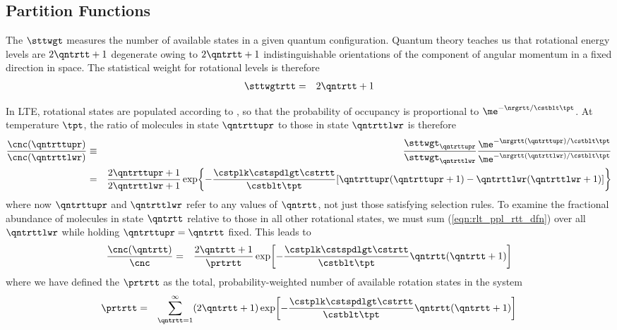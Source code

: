 \documentclass[12pt]{article}
\begin{document}
\subsection[Partition Functions]{Partition Functions}\label{sxn:prt_fnc}
The  $\sttwgt$ measures the number of
available states in a given quantum configuration.
Quantum theory teaches us that rotational energy levels are 
$2\qntrtt + 1$ degenerate owing to $2\qntrtt + 1$ indistinguishable
orientations of the component of angular momentum in a fixed direction
in space.
The statistical weight for rotational levels is therefore
\begin{eqnarray}
\sttwgtrtt & = & 2\qntrtt + 1
\label{eqn:stt_wgt_rtt_dfn}
\end{eqnarray}

In LTE, rotational states are populated according to , so that the probability of occupancy is proportional
to $\me^{-\nrgrtt/\cstblt \tpt}$.
At temperature $\tpt$, the ratio of molecules in state $\qntrttupr$ to
those in state $\qntrttlwr$ is therefore
\begin{eqnarray}
\frac{\cnc(\qntrttupr)}{\cnc(\qntrttlwr)} & \equiv & 
\frac{\sttwgt_{\qntrttupr}}{\sttwgt_{\qntrttlwr}}
\frac{\me^{-\nrgrtt(\qntrttupr)/\cstblt\tpt}}{\me^{-\nrgrtt(\qntrttlwr)/\cstblt\tpt}}
\nonumber \\ 
& = & 
\frac{2\qntrttupr + 1}{2\qntrttlwr + 1}
\exp\! \left\{ 
-\frac{\cstplk \cstspdlgt \cstrtt}{\cstblt \tpt}
[ \qntrttupr ( \qntrttupr + 1 ) - \qntrttlwr ( \qntrttlwr + 1 )]
\right\}
\label{eqn:rlt_ppl_rtt_dfn}
\end{eqnarray}
where now $\qntrttupr$ and $\qntrttlwr$ refer to any values of
$\qntrtt$, not just those satisfying selection rules.
To examine the fractional abundance of molecules in state $\qntrtt$ 
relative to those in all other rotational states, we must sum 
(\ref{eqn:rlt_ppl_rtt_dfn}) over all $\qntrttlwr$ while holding
$\qntrttupr = \qntrtt$ fixed.
This leads to 
\begin{eqnarray}
\frac{\cnc(\qntrtt)}{\cnc} & = & 
\frac{2\qntrtt + 1}{\prtrtt}
\exp\! \left[
-\frac{\cstplk \cstspdlgt \cstrtt}{\cstblt \tpt}
\qntrtt ( \qntrtt + 1 ) \right]
\label{eqn:ppl_frc_rtt_dfn}
\end{eqnarray}
where we have defined the 
$\prtrtt$ as the total, probability-weighted number of available
rotation states in the system
\begin{eqnarray}
\prtrtt & = & 
\sum_{\qntrtt = 1}^{\infty} (2\qntrtt + 1)
\exp\! \left[
-\frac{\cstplk \cstspdlgt \cstrtt}{\cstblt \tpt}
\qntrtt ( \qntrtt + 1 ) \right]
\label{eqn:prt_rtt_dfn}
\end{eqnarray}
\end{document}
